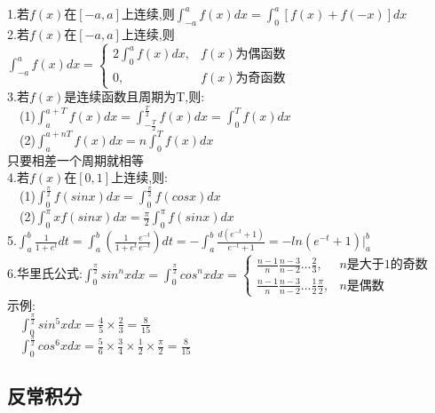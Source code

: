 \documentclass{article}
\begin{document}
\begin{flushleft}
	1.若$f(x)$在$[-a,a]$上连续,则$\int_{-a}^{a}f(x)dx=\int_{0}^{a}[f(x)+f(-x)]dx$\\
	2.若$f(x)$在$[-a,a]$上连续,则$\int_{-a}^{a}f(x)dx=\left\{
	\begin{array}{lcl}
	2\int_{0}^{a}f(x)dx, & f(x)\mbox{为偶函数}\\
	0, & f(x)\mbox{为奇函数}
	\end{array} \right.$\\
	3.若$f(x)$是连续函数且周期为T,则:\\
	\ \ (1)$\int_{a}^{a+T}f(x)dx=\int_{-\frac{T}{2}}^{\frac{T}{2}}f(x)dx=\int_{0}^{T}f(x)dx$\\
	\ \ (2)$\int_{a}^{a+nT}f(x)dx=n\int_{0}^{T}f(x)dx$\\
	只要相差一个周期就相等\\
	4.若$f(x)$在$[0,1]$上连续,则:\\
	\ \ (1)$\int_{0}^{\frac{\pi}{2}}f(sinx)dx=\int_{0}^{\frac{\pi}{2}}f(cosx)dx$\\
	\ \ (2)$\int_{0}^{\pi}xf(sinx)dx=\frac{\pi}{2}\int_{0}^{\pi}f(sinx)dx$\\
	5.$\int_{a}^{b}\frac{1}{1+e^t}dt=\int_{a}^{b}(\frac{1}{1+e^t}\frac{e^{-t}}{e^{-t}})dt=-\int_{a}^{b}\frac{d(e^{-t}+1)}{e^{-t}+1}=-ln(e^{-t}+1)|_a^b$\\
	6.华里氏公式:$\int_{0}^{\frac{\pi}{2}}sin^nxdx=\int_{0}^{\frac{\pi}{2}}cos^nxdx=\left\{
	\begin{array}{lcl}
	\frac{n-1}{n}\frac{n-3}{n-2}...\frac{2}{3}, & n\mbox{是大于1的奇数}\\
	\frac{n-1}{n}\frac{n-3}{n-2}...\frac{1}{2}\frac{\pi}{2}, & n\mbox{是偶数}
	\end{array} \right.$\\
	示例:\\
	\ \ $\int_{0}^{\frac{\pi}{2}}sin^5xdx=\frac{4}{5}\times\frac{2}{3}=\frac{8}{15}$\\
	\ \ $\int_{0}^{\frac{\pi}{2}}cos^6xdx=\frac{5}{6}\times\frac{3}{4}\times\frac{1}{2}\times\frac{\pi}{2}=\frac{8}{15}$\\
	
	\subsection{反常积分}
	

\end{flushleft}
\end{document}
